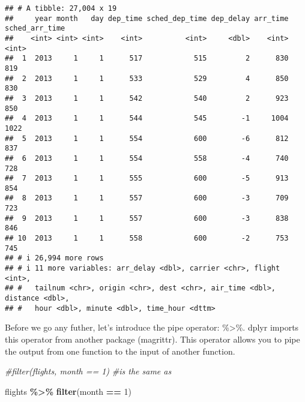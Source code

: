 \documentclass[
]{article}
\newenvironment{Shaded}{\begin{snugshade}}{\end{snugshade}}
\newcommand{\CommentTok}[1]{\textcolor[rgb]{0.56,0.35,0.01}{\textit{#1}}}
\newcommand{\DecValTok}[1]{\textcolor[rgb]{0.00,0.00,0.81}{#1}}
\newcommand{\FunctionTok}[1]{\textcolor[rgb]{0.13,0.29,0.53}{\textbf{#1}}}
\newcommand{\NormalTok}[1]{#1}
\newcommand{\SpecialCharTok}[1]{\textcolor[rgb]{0.81,0.36,0.00}{\textbf{#1}}}
\begin{document}
\begin{verbatim}
## # A tibble: 27,004 x 19
##     year month   day dep_time sched_dep_time dep_delay arr_time sched_arr_time
##    <int> <int> <int>    <int>          <int>     <dbl>    <int>          <int>
##  1  2013     1     1      517            515         2      830            819
##  2  2013     1     1      533            529         4      850            830
##  3  2013     1     1      542            540         2      923            850
##  4  2013     1     1      544            545        -1     1004           1022
##  5  2013     1     1      554            600        -6      812            837
##  6  2013     1     1      554            558        -4      740            728
##  7  2013     1     1      555            600        -5      913            854
##  8  2013     1     1      557            600        -3      709            723
##  9  2013     1     1      557            600        -3      838            846
## 10  2013     1     1      558            600        -2      753            745
## # i 26,994 more rows
## # i 11 more variables: arr_delay <dbl>, carrier <chr>, flight <int>,
## #   tailnum <chr>, origin <chr>, dest <chr>, air_time <dbl>, distance <dbl>,
## #   hour <dbl>, minute <dbl>, time_hour <dttm>
\end{verbatim}

Before we go any futher, let's introduce the pipe operator:
\%\textgreater\%. dplyr imports this operator from another package
(magrittr). This operator allows you to pipe the output from one
function to the input of another function.

\begin{Shaded}
\begin{Highlighting}[]
\CommentTok{\#filter(flights, month == 1)}
\CommentTok{\#is the same as }

\NormalTok{flights }\SpecialCharTok{\%\textgreater{}\%} \FunctionTok{filter}\NormalTok{(month }\SpecialCharTok{==} \DecValTok{1}\NormalTok{)}
\end{Highlighting}
\end{Shaded}
\end{document}
